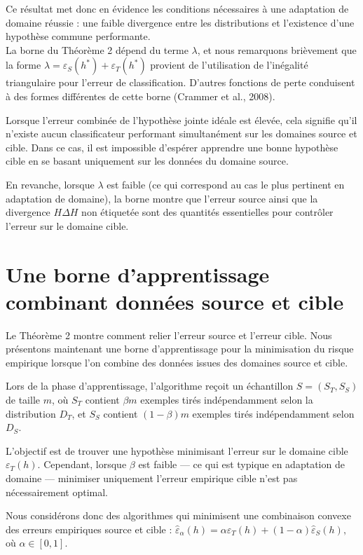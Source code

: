 \documentclass[a4paper,12pt]{article}
\theoremstyle{definition}
\theoremstyle{remark}
\begin{document}
Ce résultat met donc en évidence les conditions nécessaires à une adaptation de domaine réussie : une faible divergence entre les distributions et l’existence d’une hypothèse commune performante.\\


La borne du Théorème 2 dépend du terme $\lambda$, et nous remarquons brièvement que la forme $
\lambda = \varepsilon_S(h^*) + \varepsilon_T(h^*)$ provient de l’utilisation de l’inégalité triangulaire pour l’erreur de classification. D’autres fonctions de perte conduisent à des formes différentes de cette borne (Crammer et al., 2008).

Lorsque l’erreur combinée de l’hypothèse jointe idéale est élevée, cela signifie qu’il n’existe
aucun classificateur performant simultanément sur les domaines source et cible. Dans ce cas,
il est impossible d’espérer apprendre une bonne hypothèse cible en se basant uniquement sur
les données du domaine source.

En revanche, lorsque $\lambda$ est faible (ce qui correspond au cas le plus pertinent en adaptation
de domaine), la borne montre que l’erreur source ainsi que la divergence $H \Delta H$ non étiquetée
sont des quantités essentielles pour contrôler l’erreur sur le domaine cible.

\section{Une borne d'apprentissage combinant données source et cible}

Le Théorème 2 montre comment relier l’erreur source et l’erreur cible. Nous présentons maintenant
une borne d’apprentissage pour la minimisation du risque empirique lorsque l’on combine des
données issues des domaines source et cible.

Lors de la phase d’apprentissage, l’algorithme reçoit un échantillon $S = (S_T, S_S)$ de taille $m$, où $S_T$ contient $\beta m$ exemples tirés indépendamment selon la distribution
$D_T$, et $S_S$ contient $(1 - \beta)m$ exemples tirés indépendamment selon $D_S$.

L’objectif est de trouver une hypothèse minimisant l’erreur sur le domaine cible $\varepsilon_T(h)$.
Cependant, lorsque $\beta$ est faible — ce qui est typique en adaptation de domaine — minimiser
uniquement l’erreur empirique cible n’est pas nécessairement optimal.

Nous considérons donc des algorithmes qui minimisent une combinaison convexe des erreurs
empiriques source et cible : $\hat{\varepsilon}_\alpha(h) = \alpha \hat{\varepsilon}_T(h) + (1 -\alpha)\hat{\varepsilon}_S(h),$ où $\alpha \in [0,1]$.\\
\end{document}
